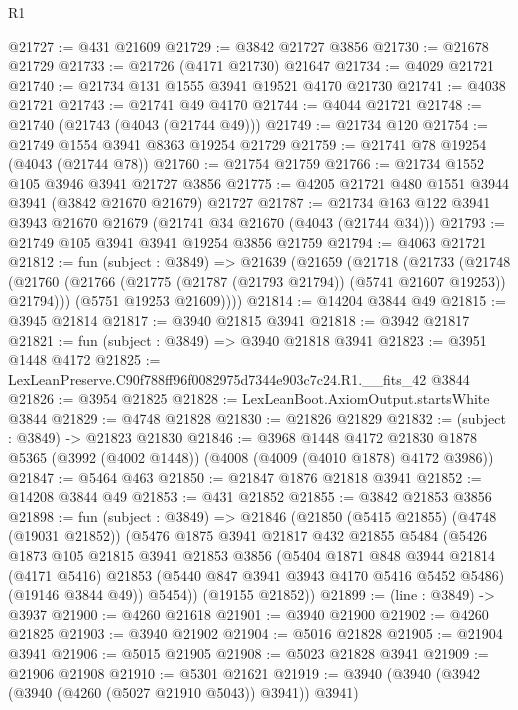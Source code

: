\begin{lexlean}{R1}
\begin{coremodule}
@21727 := @431 @21609
@21729 := @3842 @21727 @3856
@21730 := @21678 @21729
@21733 := @21726 (@4171 @21730) @21647
@21734 := @4029 @21721
@21740 := @21734 @131 @1555 @3941 @19521 @4170 @21730
@21741 := @4038 @21721
@21743 := @21741 @49 @4170
@21744 := @4044 @21721
@21748 := @21740 (@21743 (@4043 (@21744 @49)))
@21749 := @21734 @120
@21754 := @21749 @1554 @3941 @8363 @19254 @21729
@21759 := @21741 @78 @19254 (@4043 (@21744 @78))
@21760 := @21754 @21759
@21766 := @21734 @1552 @105 @3946 @3941 @21727 @3856
@21775 := @4205 @21721 @480 @1551 @3944 @3941 (@3842 @21670 @21679) @21727
@21787 := @21734 @163 @122 @3941 @3943 @21670 @21679 (@21741 @34 @21670 (@4043 (@21744 @34)))
@21793 := @21749 @105 @3941 @3941 @19254 @3856 @21759
@21794 := @4063 @21721
@21812 := fun (subject : @3849) =>
  @21639
    (@21659
      (@21718
        (@21733
          (@21748 (@21760 (@21766 (@21775 (@21787 (@21793 @21794)) (@5741 @21607 @19253)) @21794)))
          (@5751 @19253 @21609))))
@21814 := @14204 @3844 @49
@21815 := @3945 @21814
@21817 := @3940 @21815 @3941
@21818 := @3942 @21817
@21821 := fun (subject : @3849) => @3940 @21818 @3941
@21823 := @3951 @1448 @4172
@21825 := LexLeanPreserve.C90f788ff96f0082975d7344e903c7c24.R1.__fits_42 @3844
@21826 := @3954 @21825
@21828 := LexLeanBoot.AxiomOutput.startsWhite @3844
@21829 := @4748 @21828
@21830 := @21826 @21829
@21832 := (subject : @3849) -> @21823 @21830
@21846 := @3968
    @1448
    @4172
    @21830
    @1878
    @5365
    (@3992 (@4002 @1448))
    (@4008 (@4009 (@4010 @1878) @4172 @3986))
@21847 := @5464 @463
@21850 := @21847 @1876 @21818 @3941
@21852 := @14208 @3844 @49
@21853 := @431 @21852
@21855 := @3842 @21853 @3856
@21898 := fun (subject : @3849) =>
  @21846
    (@21850
      (@5415 @21855)
      (@4748 (@19031 @21852))
      (@5476
        @1875
        @3941
        @21817
        @432
        @21855
        @5484
        (@5426
          @1873
          @105
          @21815
          @3941
          @21853
          @3856
          (@5404
            @1871
            @848
            @3944
            @21814
            (@4171 @5416)
            @21853
            (@5440 @847 @3941 @3943 @4170 @5416 @5452 @5486)
            (@19146 @3844 @49))
          @5454))
      (@19155 @21852))
@21899 := (line : @3849) -> @3937
@21900 := @4260 @21618
@21901 := @3940 @21900
@21902 := @4260 @21825
@21903 := @3940 @21902
@21904 := @5016 @21828
@21905 := @21904 @3941
@21906 := @5015 @21905
@21908 := @5023 @21828 @3941
@21909 := @21906 @21908
@21910 := @5301 @21621
@21919 := @3940 (@3940 (@3942 (@3940 (@4260 (@5027 @21910 @5043)) @3941)) @3941)

\end{coremodule}
\end{lexlean}
